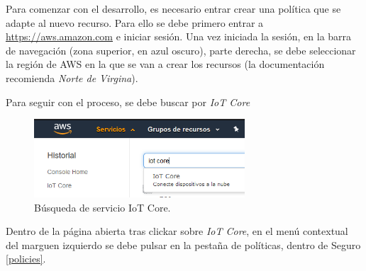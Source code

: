 \documentclass[english,runningheads,a4paper]{llncs}[2018/03/10]
\begin{document}
Para comenzar con el desarrollo, es necesario entrar crear una política que se
adapte al nuevo recurso. Para ello se debe primero entrar a  
\url{https://aws.amazon.com} e iniciar sesión. Una vez iniciada la sesión, en la
barra de navegación (zona superior, en azul oscuro), parte derecha, se debe
seleccionar la región de AWS en la que se van a crear los recursos (la
documentación recomienda \textit{Norte de Virgina}).

Para seguir con el proceso, se debe buscar por \textit{IoT Core} 

\begin{figure}[h!]
 \centering
 \includegraphics[width=0.7\textwidth]{./IoT/AWS/1-2_search_iot_core.png}
 \caption{Búsqueda de servicio IoT Core.}
 \label{search}
\end{figure}

Dentro de la página abierta tras clickar sobre \textit{IoT Core}, en el menú
contextual del marguen izquierdo se debe pulsar en la pestaña de políticas, 
dentro de Seguro \hyperref[policies]{\ref{policies}}.
\end{document}
